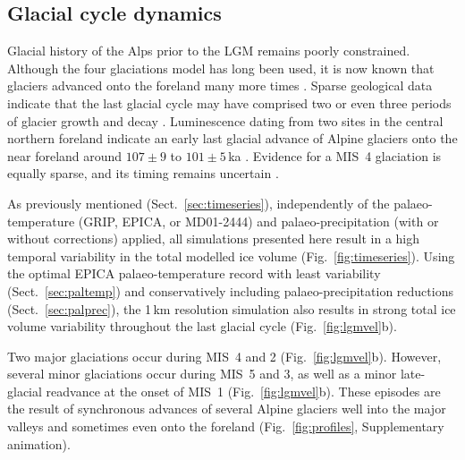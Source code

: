 \documentclass[tc, manuscript]{copernicus}
\begin{document}
\subsection{Glacial cycle dynamics}
\label{sec:glaciations}

    Glacial history of the Alps prior to the LGM remains poorly constrained.
    Although the four glaciations model \citep{Penck.Bruckner.1909} has long
    been used, it is now known that glaciers advanced onto the foreland many
    more times \citep{Schluchter.1991, Preusser.etal.2011}. Sparse geological
    data indicate that the last glacial cycle may have comprised two or even
    three periods of glacier growth and decay \citep{Preusser.2004,Ivy-Ochs.etal.2008}.
    Luminescence dating from two sites in the central northern foreland
    indicate an early last glacial advance of Alpine glaciers onto the near
    foreland around $107\pm9$ to $101\pm5$\,ka \citep{Preusser.etal.2003,
    Preusser.Schluchter.2004}. Evidence for a MIS~4 glaciation is equally
    sparse, and its timing remains uncertain
    \citep[e.g.,][]{Preusser.etal.2007, Link.Preusser.2006}.

    As previously mentioned (Sect.~\ref{sec:timeseries}), independently of the
    palaeo-temperature (GRIP, EPICA, or MD01-2444) and palaeo-precipitation
    (with or without corrections) applied, all simulations presented here
    result in a high temporal variability in the total modelled ice volume
    (Fig.~\ref{fig:timeseries}). Using the optimal EPICA palaeo-temperature
    record with least variability (Sect.~\ref{sec:paltemp}) and conservatively
    including palaeo-precipitation reductions (Sect.~\ref{sec:palprec}), the
    1\,km resolution simulation also results in strong total ice volume
    variability throughout the last glacial cycle (Fig.~\ref{fig:lgmvel}b).

    Two major glaciations occur during MIS~4 and 2 (Fig.~\ref{fig:lgmvel}b).
    However, several minor glaciations occur during MIS~5 and 3, as well as a
    minor late-glacial readvance at the onset of MIS~1
    (Fig.~\ref{fig:lgmvel}b). These episodes are the result of synchronous
    advances of several Alpine glaciers well into the major valleys and sometimes
    even onto the foreland (Fig.~\ref{fig:profiles}, Supplementary animation).
\end{document}
